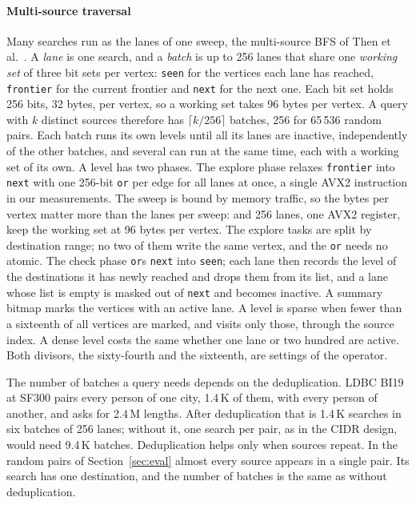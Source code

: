 \paragraph{Multi-source traversal} Many searches run as the lanes of one sweep, the multi-source BFS of Then et
al.~\cite{then2014msbfs}. A \emph{lane} is one search, and a \emph{batch} is up to 256 lanes that share one
\emph{working set} of three bit sets per vertex: \texttt{seen} for the vertices each lane has reached,
\texttt{frontier} for the current frontier and \texttt{next} for the next one. Each bit set holds 256 bits, 32 bytes,
per vertex, so a working set takes 96 bytes per vertex. A query with $k$ distinct sources therefore has
$\lceil k/256 \rceil$ batches, 256 for 65\,536 random pairs. Each batch runs its own levels until all its lanes are
inactive, independently of the other batches, and several can run at the same time, each with a working set
of its own. A level has two phases. The explore phase relaxes
\texttt{frontier} into \texttt{next} with one 256-bit \texttt{or} per edge for all lanes at once, a single AVX2
instruction in our measurements. The sweep is bound by memory traffic, so the bytes per vertex matter more than the
lanes per sweep: and 256 lanes, one AVX2 register, keep the working set at 96 bytes per vertex. The explore tasks are split by destination range; no two of them
write the same vertex, and the \texttt{or} needs no atomic. The check phase \texttt{or}s \texttt{next} into \texttt{seen};
each lane then records the level of the destinations it has newly reached and drops them from its list, and a lane
whose list is empty is masked out of \texttt{next} and becomes inactive. A summary bitmap marks the vertices with an
active lane. A level is sparse when fewer than a sixteenth of all vertices are marked, and visits only those, through
the source index. A dense level costs the same whether one lane or two hundred are active. Both divisors, the
sixty-fourth and the sixteenth, are settings of the operator.

The number of batches a query needs depends on the deduplication. LDBC BI19 at SF300 pairs every person of one city,
1.4\,K of them, with every person of another, and asks for 2.4\,M lengths. After deduplication that is 1.4\,K searches
in six batches of 256 lanes; without it, one search per pair, as in the CIDR design, would need 9.4\,K batches.
Deduplication helps only when sources repeat. In the random pairs of Section~\ref{sec:eval} almost every source
appears in a single pair. Its search has one destination, and the number of batches is the same as without
deduplication.

